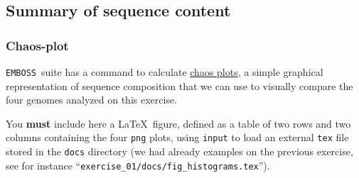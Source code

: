 \documentclass[10pt,a4paper,]{article}
\newenvironment{Shaded}{}{}
\newcommand{\AlertTok}[1]{\textcolor[rgb]{1.00,0.00,0.00}{\textbf{#1}}}
\newcommand{\BuiltInTok}[1]{#1}
\newcommand{\CommentTok}[1]{\textcolor[rgb]{0.38,0.63,0.69}{\textit{#1}}}
\newcommand{\ExtensionTok}[1]{#1}
\newcommand{\FunctionTok}[1]{\textcolor[rgb]{0.02,0.16,0.49}{#1}}
\newcommand{\KeywordTok}[1]{\textcolor[rgb]{0.00,0.44,0.13}{\textbf{#1}}}
\newcommand{\NormalTok}[1]{#1}
\newcommand{\StringTok}[1]{\textcolor[rgb]{0.25,0.44,0.63}{#1}}
\newcommand{\VariableTok}[1]{\textcolor[rgb]{0.10,0.09,0.49}{#1}}
\begin{document}
\hypertarget{summary-of-sequence-content}{%
\subsection{Summary of sequence
content}\label{summary-of-sequence-content}}

\hypertarget{chaos-plot}{%
\subsubsection{Chaos-plot}\label{chaos-plot}}

\texttt{EMBOSS}~suite has a command to calculate
\href{http://emboss.sourceforge.net/apps/cvs/emboss/apps/chaos.html}{chaos
plots}, a simple graphical representation of sequence composition that
we can use to visually compare the four genomes analyzed on this
exercise.

\begin{Shaded}
\end{Shaded}

You \textbf{must} include here a \LaTeX~figure, defined as a table of
two rows and two columns containing the four \texttt{png} plots, using
\texttt{input} to load an external \texttt{tex} file stored in the
\texttt{docs} directory (we had already examples on the previous
exercise, see for instance
``\texttt{exercise\_01/docs/fig\_histograms.tex}'').
\end{document}
